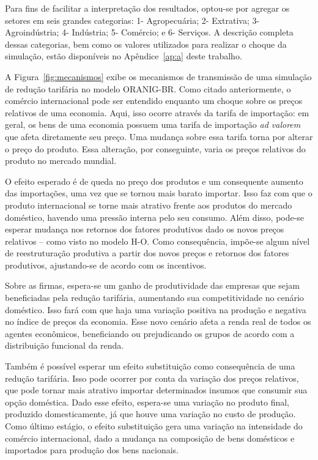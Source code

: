 Para fins de facilitar a interpretação dos resultados, optou-se por agregar os setores em seis grandes categorias: 1- Agropecuária; 2- Extrativa; 3- Agroindústria; 4- Indústria; 5- Comércio; e 6- Serviços. A descrição completa dessas categorias, bem como os valores utilizados para realizar o choque da simulação, estão disponíveis no Apêndice~\ref{ap:a} deste trabalho.

A Figura~\ref{fig:mecanismos} exibe os mecanismos de transmissão de uma simulação de redução tarifária no modelo ORANIG-BR. Como citado anteriormente, o comércio internacional pode ser entendido enquanto um choque sobre os preços relativos de uma economia. Aqui, isso ocorre através da tarifa de importação: em geral, os bens de uma economia possuem uma tarifa de importação \textit{ad valorem} que afeta diretamente seu preço. Uma mudança sobre essa tarifa torna por alterar o preço do produto. Essa alteração, por conseguinte, varia os preços relativos do produto no mercado mundial.

O efeito esperado é de queda no preço dos produtos e um consequente aumento das importações, uma vez que se tornou mais barato importar. Isso faz com que o produto internacional se torne mais atrativo frente aos produtos do mercado doméstico, havendo uma pressão interna pelo seu consumo. Além disso, pode-se esperar mudança nos retornos dos fatores produtivos dado os novos preços relativos -- como visto no modelo H-O. Como consequência, impõe-se algum nível de reestruturação produtiva a partir dos novos preços e retornos dos fatores produtivos, ajustando-se de acordo com os incentivos.

Sobre as firmas, espera-se um ganho de produtividade das empresas que sejam beneficiadas pela redução tarifária, aumentando sua competitividade no cenário doméstico. Isso fará com que haja uma variação positiva na produção e negativa no índice de preços da economia. Esse novo cenário afeta a renda real de todos os agentes econômicos, beneficiando ou prejudicando os grupos de acordo com a distribuição funcional da renda.

Também é possível esperar um efeito substituição como consequência de uma redução tarifária. Isso pode ocorrer por conta da variação dos preços relativos, que pode tornar mais atrativo importar determinados insumos que consumir sua opção doméstica. Dado esse efeito, espera-se uma variação no produto final, produzido domesticamente, já que houve uma variação no custo de produção. Como último estágio, o efeito substituição gera uma variação na intensidade do comércio internacional, dado a mudança na composição de bens domésticos e importados para produção dos bens nacionais.

